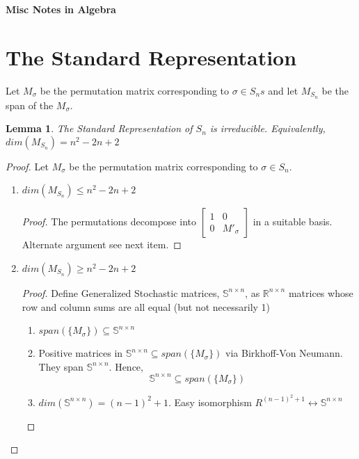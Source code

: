 \documentclass{sig-alternate}
\newtheorem{lemma}[theorem]{Lemma}
\begin{document}
\onecolumn
\begin{center}\bf{\large{Misc Notes in Algebra}}\end{center}
\twocolumn
\section{The Standard Representation}
Let $M_{\sigma}$ be the permutation matrix corresponding to $\sigma \in S_ns$ and let $M_{S_n}$ be the span of the $M_{\sigma}$.
\begin{lemma}
The Standard Representation of $S_n$ is irreducible. Equivalently, $dim(M_{S_n}) = n^2 -2n + 2$
\end{lemma}
\begin{proof}
Let $M_{\sigma}$ be the permutation matrix corresponding to $\sigma \in S_n$.
\begin{enumerate}
\item $dim(M_{S_n}) \leq n^2 - 2n + 2$
\begin{proof}
The permutations decompose into $\left[ \begin{array}{cc} 1 & 0 \\ 0 & M'_{\sigma} \end{array} \right]$ in a suitable basis. Alternate argument see next item.
\end{proof}
\item $dim(M_{S_n}) \geq n^2 - 2n + 2$
\begin{proof}
Define Generalized Stochastic matrices, $\mathbb{S}^{n\times n}$, as $\mathbb{R}^{n\times n}$ matrices whose row and column sums are all equal (but not necessarily 1)
\begin{enumerate}
\item $span(\{M_{\sigma}\}) \subseteq \mathbb{S}^{n\times n}$ 
\item Positive matrices in $\mathbb{S}^{n\times n} \subseteq span(\{M_{\sigma}\})$ via Birkhoff-Von Neumann. They span $\mathbb{S}^{n\times n}$. Hence, \[\mathbb{S}^{n\times n} \subseteq span(\{M_{\sigma}\})\]
\item $dim(\mathbb{S}^{n\times n}) = (n-1)^2 + 1$. Easy isomorphism $R^{(n-1)^2 + 1} \leftrightarrow \mathbb{S}^{n\times n}$
\end{enumerate}
\end{proof}
\end{enumerate}
\end{proof}
\end{document}

